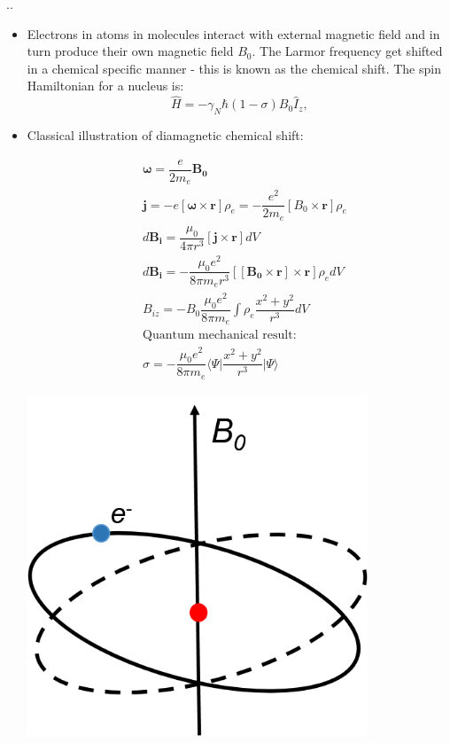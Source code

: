 \documentclass[handout]{beamer}
\begin{document}
\begin{frame}{\thesection.\thesubsection. \insertsubsection}
	\begin{itemize}[<+>]
		\item 
			Electrons in atoms in molecules interact with external magnetic field and in turn produce their own magnetic field $B_0$. The Larmor frequency get shifted in a chemical specific manner - this is known as the \alert{chemical shift}.  The spin Hamiltonian for a nucleus is:
		\begin{equation}
			\hat{H} = -\gamma_N \hbar (1 - \sigma) B_0 \hat{I}_z,
		\end{equation}
	
		
		\item Classical illustration of diamagnetic chemical shift:	
			
				\begin{minipage}{0.4\textwidth}
					{\tiny
					\begin{align*}
					&\bm{\omega} = \dfrac{e}{2 m_e} \bm{B_0} \\
					&\bm{j} = -e[\bm{\omega} \times \bm{r}] \rho_e = -\dfrac{e^2}{2m_e}[B_0 \times \bm{r}] \rho_e \\				
					&d \bm{B_i} =  \dfrac{\mu_0}{4 \pi r^3}[\bm{j} \times \bm{r}] dV	\\
					&d \bm{B_i} = - \dfrac{\mu_0 e^2}{8 \pi m_e r^3}[[\bm{B_0} \times \bm{r}] \times \bm{r}] \rho_e dV	\\
					& B_{iz}  = - B_0 \dfrac{\mu_0 e^2}{8 \pi m_e} \int \rho_e \dfrac{x^2 + y^2}{r^3}  dV \\ 	
					&\text{Quantum mechanical result:}  \\
					&\sigma = - \dfrac{\mu_0 e^2}{8 \pi m_e} \langle \Psi \vert \dfrac{x^2 + y^2}{r^3} \vert \Psi \rangle 
					\end{align*}
				    }%
				\end{minipage}
				\hspace{0.1 cm}
				\begin{minipage}{0.45\textwidth}
					\includegraphics[width = 0.8\textwidth]{diamagnetic_term.png}
				\end{minipage}
			
	\end{itemize}
\end{frame}
\end{document}
